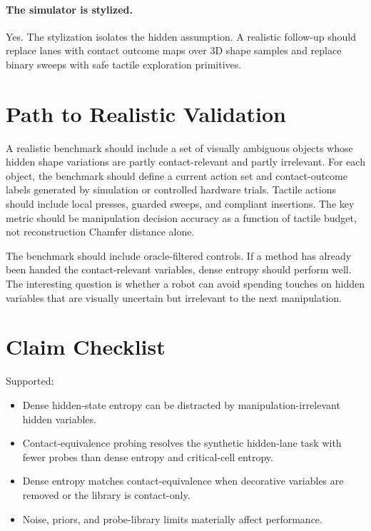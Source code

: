 \documentclass{article}
\begin{document}
\paragraph{The simulator is stylized.}
Yes. The stylization isolates the hidden assumption. A realistic follow-up should replace lanes with contact outcome maps over 3D shape samples and replace binary sweeps with safe tactile exploration primitives.

\section{Path to Realistic Validation}

A realistic benchmark should include a set of visually ambiguous objects whose hidden shape variations are partly contact-relevant and partly irrelevant. For each object, the benchmark should define a current action set and contact-outcome labels generated by simulation or controlled hardware trials. Tactile actions should include local presses, guarded sweeps, and compliant insertions. The key metric should be manipulation decision accuracy as a function of tactile budget, not reconstruction Chamfer distance alone.

The benchmark should include oracle-filtered controls. If a method has already been handed the contact-relevant variables, dense entropy should perform well. The interesting question is whether a robot can avoid spending touches on hidden variables that are visually uncertain but irrelevant to the next manipulation.

\section{Claim Checklist}

Supported:
\begin{itemize}
    \item Dense hidden-state entropy can be distracted by manipulation-irrelevant hidden variables.
    \item Contact-equivalence probing resolves the synthetic hidden-lane task with fewer probes than dense entropy and critical-cell entropy.
    \item Dense entropy matches contact-equivalence when decorative variables are removed or the library is contact-only.
    \item Noise, priors, and probe-library limits materially affect performance.
\end{itemize}
\end{document}
